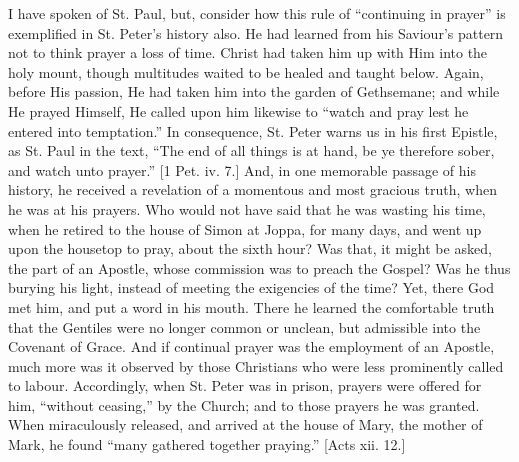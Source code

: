 I have spoken of St. Paul, but, consider how this rule of
``continuing in prayer'' is exemplified in St. Peter's
history also. He had learned from his Saviour's pattern not to think
prayer a loss of time. Christ had taken him up with Him into the holy
mount, though multitudes waited to be healed and taught below. Again,
before His passion, He had taken him into the garden of Gethsemane;
and while He prayed Himself, He called upon him likewise to
``watch and pray lest he entered into temptation.'' In
consequence, St. Peter warns us in his first Epistle, as St. Paul in
the text, ``The end of all things is at hand, be ye therefore
sober, and watch unto prayer.'' [1 Pet. iv. 7.] And, in one
memorable passage of his history, he received a revelation of a
momentous and most gracious truth, when he was at his prayers. Who
would not have said that he was wasting his time, when he retired to
the house of Simon at Joppa, for many days, and went up upon the
housetop to pray, about the sixth hour? Was that, it might be asked,
the part of an Apostle, whose commission was to preach the Gospel? Was
he thus burying his light, instead of meeting the exigencies of the
time? Yet, there God met him, and put a word in his mouth. There he
learned the comfortable truth that the Gentiles were no longer common
or unclean, but admissible into the Covenant of Grace. And if
continual prayer was the employment of an Apostle, much more was it
observed by those Christians who were less prominently called to
labour. Accordingly, when St. Peter was in prison, prayers were
offered for him, ``without ceasing,'' by the Church; and to
those prayers he was granted. When miraculously released, and arrived
at the house of Mary, the mother of Mark, he found ``many gathered
together praying.'' [Acts xii. 12.]

